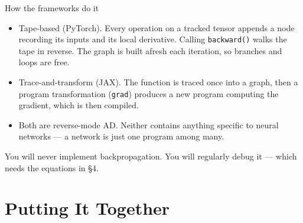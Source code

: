 \documentclass[aspectratio=169, 11pt]{beamer}
\newcommand{\src}[3]{}      %
\begin{document}
\begin{frame}{How the frameworks do it}
  \src{prince2023}{section}{7.4.2}
  \src{baydin2018}{section}{5}
  \vspace{0.3em}
  {\small
  \begin{itemize}\setlength{\itemsep}{4pt}
    \item \alert{Tape-based (PyTorch).} Every operation on a tracked
          tensor appends a node recording its inputs and its local
          derivative. Calling \texttt{backward()} walks the tape in
          reverse. The graph is built afresh each iteration, so
          branches and loops are free.
    \item \alert{Trace-and-transform (JAX).} The function is traced
          once into a graph, then a program transformation
          (\texttt{grad}) produces a new program computing the
          gradient, which is then compiled.
    \item Both are reverse-mode AD. Neither contains anything specific
          to neural networks --- a network is just one program among
          many.
  \end{itemize}}
  \vspace{0.3em}
  \begin{redhighlight}
    {\small You will never implement backpropagation. You will
    regularly \alert{debug} it --- which needs the equations in \S4.}
  \end{redhighlight}
\end{frame}

\section{Putting It Together}
\end{document}
